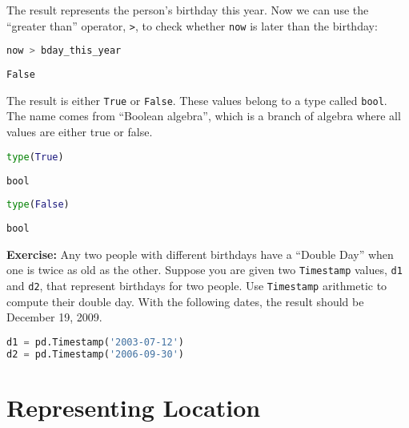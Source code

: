 The result represents the person's birthday this year. Now we can use
the ``greater than'' operator, \passthrough{\lstinline!>!}, to check
whether \passthrough{\lstinline!now!} is later than the birthday:

\begin{lstlisting}[language=Python,style=source]
now > bday_this_year
\end{lstlisting}

\begin{lstlisting}[style=output]
False
\end{lstlisting}

The result is either \passthrough{\lstinline!True!} or
\passthrough{\lstinline!False!}. These values belong to a type called
\passthrough{\lstinline!bool!}. The name comes from ``Boolean algebra'',
which is a branch of algebra where all values are either true or false.

\begin{lstlisting}[language=Python,style=source]
type(True)
\end{lstlisting}

\begin{lstlisting}[style=output]
bool
\end{lstlisting}

\begin{lstlisting}[language=Python,style=source]
type(False)
\end{lstlisting}

\begin{lstlisting}[style=output]
bool
\end{lstlisting}

\textbf{Exercise:} Any two people with different birthdays have a
``Double Day'' when one is twice as old as the other. Suppose you are
given two \passthrough{\lstinline!Timestamp!} values,
\passthrough{\lstinline!d1!} and \passthrough{\lstinline!d2!}, that
represent birthdays for two people. Use
\passthrough{\lstinline!Timestamp!} arithmetic to compute their double
day. With the following dates, the result should be December 19, 2009.

\begin{lstlisting}[language=Python,style=source]
d1 = pd.Timestamp('2003-07-12')
d2 = pd.Timestamp('2006-09-30')
\end{lstlisting}

\hypertarget{representing-location}{%
\section{Representing Location}\label{representing-location}}

